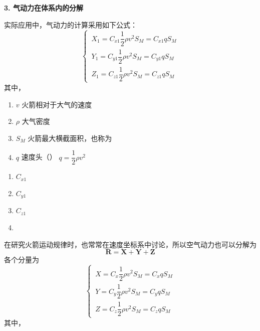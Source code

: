 \noindent \textbf{3. 气动力在体系内的分解}

实际应用中，气动力的计算采用如下公式：
\begin{equation}
	\begin{cases}
		\, X_1 = C_{x1}\dfrac{1}{2}\rho v^2 S_M = C_{x1}qS_M\\[1em]
		\, Y_1 = C_{y1}\dfrac{1}{2}\rho v^2 S_M = C_{y1}qS_M\\[1em]
		\, Z_1 = C_{z1}\dfrac{1}{2}\rho v^2 S_M = C_{z1}qS_M
	\end{cases}
	\label{气动力1}
\end{equation}
\noindent 其中，
\vspace*{0.5em}

\begin{minipage}{0.5\linewidth}
	\begin{enumerate}[]
		\item $v$ \quad 火箭相对于大气的速度\vspace*{-0.5em}
		\item $\rho$ \quad 大气密度\vspace*{-0.5em}
		\item $S_M$ \quad 火箭最大横截面积，也称为\vspace*{-0.5em}
		\item $q$ \quad 速度头（） $q = \dfrac{1}{2} \rho v^2$ \vspace*{-0.5em}
	\end{enumerate}
\end{minipage}
\begin{minipage}{0.5\linewidth}
	\begin{enumerate}[]
		\item $C_{x1}$ \quad {}\vspace*{-0.5em}
		\item $C_{y1}$ \quad {}\vspace*{-0.5em}
		\item $C_{z1}$ \quad {}
		\item
	\end{enumerate}
\end{minipage}
\vspace*{1em}

在研究火箭运动规律时，也常常在速度坐标系中讨论，所以空气动力也可以分解为
\begin{equation}
	\bm{R} = \bm{X} + \bm{Y} + \bm{Z}
\end{equation}
各个分量为
\begin{equation}
	\begin{cases}
		\, X = C_{x}\dfrac{1}{2}\rho v^2 S_M = C_{x}qS_M\\[1em]
		\, Y = C_{y}\dfrac{1}{2}\rho v^2 S_M = C_{y}qS_M\\[1em]
		\, Z = C_{z}\dfrac{1}{2}\rho v^2 S_M = C_{z}qS_M
	\end{cases}
	\label{气动力2}
\end{equation}
\noindent 其中，
\vspace*{0.5em}

